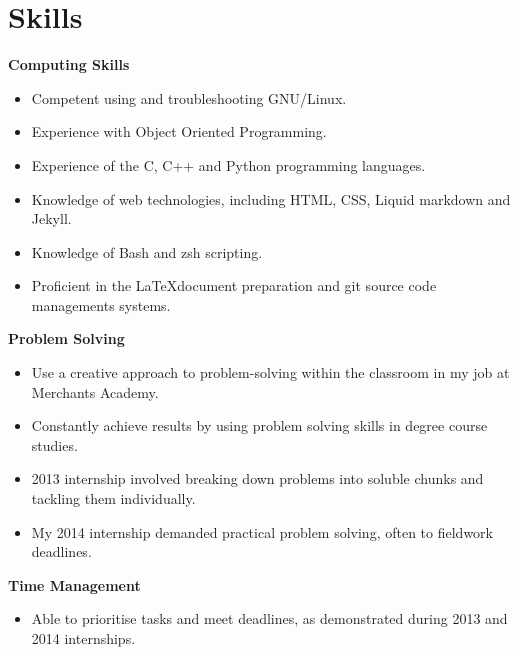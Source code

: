 \documentclass[11pt,a4paper,sans]{moderncv}
\begin{document}
\vspace{2pt}

\newpage

\section{Skills}

{\large\textbf{Computing Skills}}

\begin{itemize}
\item Competent using and troubleshooting GNU/Linux.
\item Experience with Object Oriented Programming.
\item Experience of the C, C++ and Python programming languages.
\item Knowledge of web technologies, including HTML, CSS, Liquid markdown and
    Jekyll.
\item Knowledge of Bash and zsh scripting.
\item Proficient in the \LaTeX \space document preparation and git source
    code managements systems.
\end{itemize}

\vspace{1em}

{\large\textbf{Problem Solving}}

\begin{itemize}
\item Use a creative approach to problem-solving within the classroom in my job
    at Merchants Academy.
\item Constantly achieve results by using problem solving skills in degree
    course studies.
\item 2013 internship involved breaking down problems into soluble
    chunks and tackling them individually. %
\item My 2014 internship demanded practical problem solving, often to fieldwork
    deadlines.
\end{itemize}

\vspace{1em}

{\large\textbf{Time Management}}

\begin{itemize}
\item Able to prioritise tasks and meet deadlines, as demonstrated during 2013
    and 2014 internships.
\end{itemize}
\end{document}
